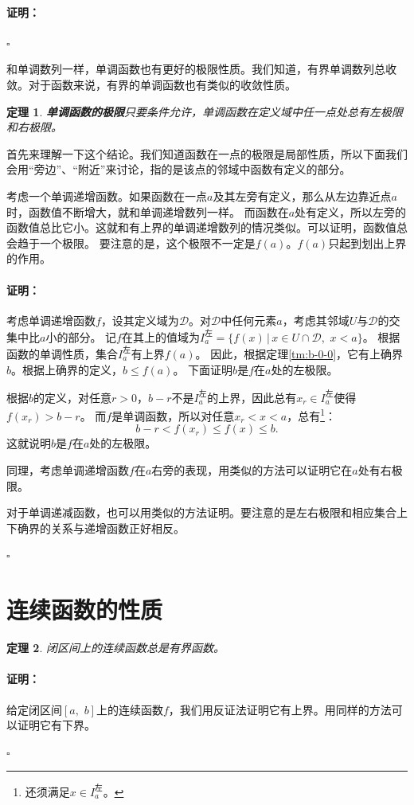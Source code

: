 \documentclass[12pt,UTF8]{ctexbook}
\newtheorem{tm}{定理}[section]
\renewenvironment{proof}{\paragraph{\textbf{证明：}}}{\hfill$\square$}
\begin{document}
\begin{appendix}
\begin{proof}
\end{proof}

和单调数列一样，单调函数也有更好的极限性质。我们知道，有界单调数列总收敛。对于函数来说，有界的单调函数也有类似的收敛性质。
\begin{tm}{\textbf{单调函数的极限}}\label{tm:b-0-30}
    只要条件允许，单调函数在定义域中任一点处总有左极限和右极限。
\end{tm}
首先来理解一下这个结论。我们知道函数在一点的极限是局部性质，所以下面我们会用“旁边”、“附近”来讨论，指的是该点的邻域中函数有定义的部分。

考虑一个单调递增函数。如果函数在一点$a$及其左旁有定义，那么从左边靠近点$a$时，函数值不断增大，就和单调递增数列一样。
而函数在$a$处有定义，所以左旁的函数值总比它小。这就和有上界的单调递增数列的情况类似。可以证明，函数值总会趋于一个极限。
要注意的是，这个极限不一定是$f(a)$。$f(a)$只起到划出上界的作用。
\begin{proof}
    考虑单调递增函数$f$，设其定义域为$\mathcal{D}$。对$\mathcal{D}$中任何元素$a$，考虑其邻域$U$与$\mathcal{D}$的交集中比$a$小的部分。
    记$f$在其上的值域为$I_a^{\text{左}} = \{f(x) \, | \, x \in U\cap\mathcal{D}, \,\, x < a\}$。
    根据函数的单调性质，集合$I_a^{\text{左}}$有上界$f(a)$。
    因此，根据定理\ref{tm:b-0-0}，它有上确界$b$。根据上确界的定义，$b\leqslant f(a)$。
    下面证明$b$是$f$在$a$处的左极限。

    根据$b$的定义，对任意$r>0$，$b - r$不是$I_a^{\text{左}}$的上界，因此总有$x_r\in I_a^{\text{左}}$使得$f(x_r)>b-r$。
    而$f$是单调函数，所以对任意$x_r<x<a$，总有\footnote{还须满足$x\in I_a^{\text{左}}$。}：
    $$ b - r < f(x_r) \leqslant f(x) \leqslant b.$$
    这就说明$b$是$f$在$a$处的左极限。 

    同理，考虑单调递增函数$f$在$a$右旁的表现，用类似的方法可以证明它在$a$处有右极限。

    对于单调递减函数，也可以用类似的方法证明。要注意的是左右极限和相应集合上下确界的关系与递增函数正好相反。

\end{proof}

\section{连续函数的性质}

\begin{tm}\label{tm:b-1-0}
    闭区间上的连续函数总是有界函数。
\end{tm}
\begin{proof}
    给定闭区间$[a,\,\, b]$上的连续函数$f$，我们用反证法证明它有上界。用同样的方法可以证明它有下界。


\end{proof}
\end{appendix}
\end{document}
